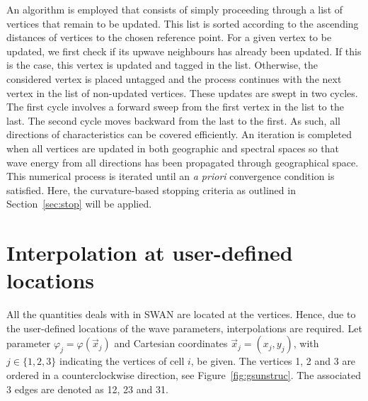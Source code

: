 \documentclass[12pt]{book}
\begin{document}
An algorithm is employed that consists of simply proceeding through a list of vertices that remain to be updated. This list is sorted according to the ascending distances
of vertices to the chosen reference point. For a given vertex to be updated,
we first check if its upwave neighbours has already been
updated. If this is the case, this vertex is updated and tagged in the list. Otherwise, the considered vertex is placed untagged and the process continues with the next vertex in the list
of non-updated vertices.
These updates are swept in two cycles. The first cycle involves a forward sweep from the first vertex in the list to the last. The second cycle moves backward from the last to the first.
As such, all directions of characteristics can be covered efficiently.
An iteration is completed when all vertices are updated in both geographic and spectral spaces so that wave energy from all directions has been propagated through geographical space.
This numerical process is iterated until an {\em a priori} convergence condition is satisfied. Here, the curvature-based stopping criteria
as outlined in Section~\ref{sec:stop} will be applied.

\section{Interpolation at user-defined locations}

All the quantities deals with in SWAN are located at the vertices. Hence, due to the user-defined locations of the wave parameters, interpolations are required.
Let parameter $\varphi_j = \varphi(\vec{x}_j)$ and Cartesian coordinates $\vec{x}_j = (x_j, y_j)$, with $j \in \{1,2,3\}$ indicating the vertices of cell $i$, be given.
The vertices 1, 2 and 3 are ordered in a counterclockwise direction, see Figure~\ref{fig:gsunstruc}. The associated 3 edges are denoted as 12, 23 and 31.
\end{document}

